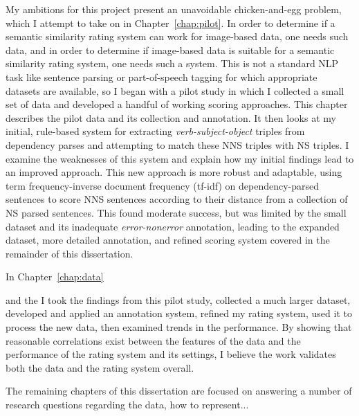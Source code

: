 My ambitions for this project present an unavoidable chicken-and-egg problem, which I attempt to take on in Chapter~\ref{chap:pilot}. In order to determine if a semantic similarity rating system can work for image-based data, one needs such data, and in order to determine if image-based data is suitable for a semantic similarity rating system, one needs such a system. This is not a standard NLP task like sentence parsing or part-of-speech tagging for which appropriate datasets are available, so I began with a pilot study in which I collected a small set of data and developed a handful of working scoring approaches. This chapter describes the pilot data and its collection and annotation. It then looks at my initial, rule-based system for extracting \textit{verb-subject-object} triples from dependency parses and attempting to match these NNS triples with NS triples. I examine the weaknesses of this system and explain how my initial findings lead to an improved approach. This new approach is more robust and adaptable, using term frequency-inverse document frequency (tf-idf) on dependency-parsed sentences to score NNS sentences according to their distance from a collection of NS parsed sentences. This found moderate success, but was limited by the small dataset and its inadequate \textit{error-nonerror} annotation, leading to the expanded dataset, more detailed annotation, and refined scoring system covered in the remainder of this dissertation. 

In Chapter~\ref{chap:data}

and the I took the findings from this pilot study, collected a much larger dataset, developed and applied an annotation system, refined my rating system, used it to process the new data, then examined trends in the performance. By showing that reasonable correlations exist between the features of the data and the performance of the rating system and its settings, I believe the work validates both the data and the rating system overall.





The remaining chapters of this dissertation are focused on answering a number of research questions regarding the data, how to represent...




